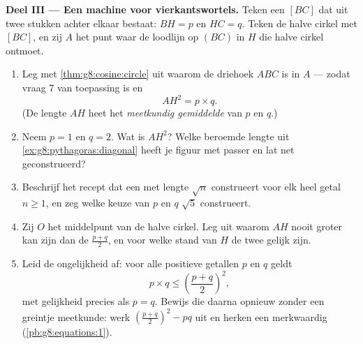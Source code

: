 \begin{problem}[{Weekendopgave --- de hoogtelijn van een rechthoekige driehoek:
$AB^2 = BH \times BC$, $AH^2 = BH \times HC$, een tweede bewijs van Pythagoras,
en een machine om vierkantswortels te construeren}]
\medskip
\noindent\textbf{Deel III --- Een machine voor vierkantswortels.}
Teken een  $[BC]$ dat uit twee stukken achter elkaar bestaat: $BH = p$ en
$HC = q$. Teken de halve cirkel met  $[BC]$, en zij $A$ het punt waar de
loodlijn op $(BC)$ in $H$ die halve cirkel ontmoet.
\begin{enumerate}[resume]
  \item Leg met \cref{thm:g8:cosine:circle} uit waarom de driehoek $ABC$
         is in $A$ --- zodat vraag 7 van toepassing is en
        \[
        AH^2 = p \times q .
        \]
        (De lengte $AH$ heet het \emph{meetkundig
        gemiddelde} van $p$ en $q$.)
  \item Neem $p = 1$ en $q = 2$. Wat is $AH^2$? Welke beroemde lengte uit
        \cref{ex:g8:pythagoras:diagonal} heeft je figuur met passer en lat net
        geconstrueerd?
  \item Beschrijf het recept dat een  met lengte $\sqrt n$ construeert
        voor elk heel getal $n \geq 1$, en zeg welke keuze van $p$ en $q$
        $\sqrt 5$ construeert.
  \item Zij $O$ het middelpunt van de halve cirkel. Leg uit waarom $AH$ nooit
        groter kan zijn dan de  $\frac{p + q}{2}$, en voor welke stand van
        $H$ de twee gelijk zijn.
  \item Leid de ongelijkheid af: voor alle positieve getallen $p$ en $q$ geldt
        \[
        p \times q \leq \left(\frac{p + q}{2}\right)^2,
        \]
        met gelijkheid precies als $p = q$. Bewijs die daarna opnieuw zonder een
        greintje meetkunde: werk $\left(\frac{p+q}{2}\right)^2 - p q$ uit en
        herken een merkwaardig  (\cref{pb:g8:equations:1}).
\end{enumerate}
\end{problem}
